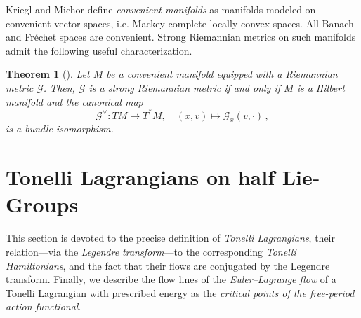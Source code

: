 \documentclass[11pt,reqno]{amsart}
\theoremstyle{plain}
\newtheorem{thm}{Theorem}[section]
\theoremstyle{definition}
\theoremstyle{plain} %
\theoremstyle{definition} %
\numberwithin{equation}{section}
\def\G{\mathcal{G}}
\begin{document}
Kriegl and Michor \cite{KrieglMichor1997} define \textit{convenient manifolds} as manifolds modeled on convenient vector spaces, i.e. Mackey complete locally convex spaces. All Banach and Fréchet spaces are convenient. Strong Riemannian metrics on such manifolds admit the following useful characterization.
\begin{thm}[{\cite[Theorem 7.2]{Bauer_2025}}]
    Let \( M\) be a convenient manifold equipped with a Riemannian metric $\G$. Then, \( \G \) is a strong Riemannian metric if and only if $M$ is a Hilbert manifold and the canonical map
    \begin{equation*}
\mathcal{G}^\vee \colon TM \longrightarrow T^*M, 
\quad (x, v) \mapsto \mathcal{G}_x(v, \cdot) \,  ,
\end{equation*}
    is a bundle isomorphism.
\end{thm}


\section{Tonelli Lagrangians on half Lie-Groups}\label{s:Tonelli Lagrangians on half Lie-Groups}
This section is devoted to the precise definition of \emph{Tonelli Lagrangians}, 
their relation---via the \emph{Legendre transform}---to the corresponding 
\emph{Tonelli Hamiltonians}, and the fact that their flows are conjugated 
by the Legendre transform. 
Finally, we describe the flow lines of the \emph{Euler--Lagrange flow} 
of a Tonelli Lagrangian with prescribed energy as the 
\emph{critical points of the free-period action functional}.
\end{document}
